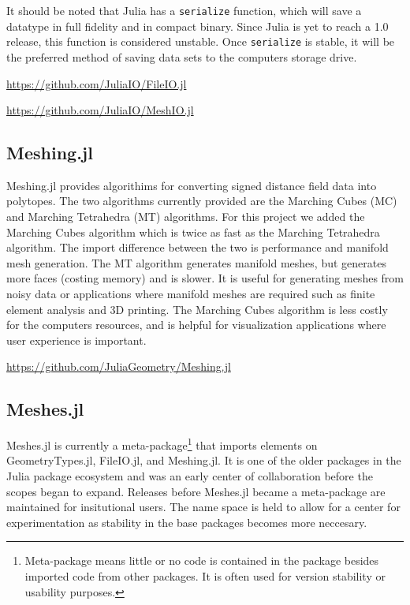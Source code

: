 It should be noted that Julia has a \texttt{serialize} function, which will
save a datatype in full fidelity and in compact binary. Since Julia is
yet to reach a 1.0 release, this function is considered unstable. Once
\texttt{serialize} is stable, it will be the preferred method of saving
data sets to the computers storage drive.

\url{https://github.com/JuliaIO/FileIO.jl}

\url{https://github.com/JuliaIO/MeshIO.jl}

\subsection{Meshing.jl}

Meshing.jl provides algorithims for converting signed distance field
data into polytopes. The two algorithms currently provided are
the Marching Cubes (MC) and Marching Tetrahedra (MT) algorithms. For this project
we added the Marching Cubes algorithm which is twice as fast as the
Marching Tetrahedra algorithm. The import difference between the two is
performance and manifold mesh generation. The MT algorithm generates manifold
meshes, but generates more faces (costing memory) and is slower.
It is useful for generating
meshes from noisy data or applications where manifold meshes are required
such as finite element analysis and 3D printing. The Marching Cubes algorithm
is less costly for the computers resources, and is helpful for visualization
applications where user experience is important.

\url{https://github.com/JuliaGeometry/Meshing.jl}

\subsection{Meshes.jl}

Meshes.jl is currently a meta-package\footnote{Meta-package means
little or no code is contained in the package besides imported code
from other packages. It is
often used for version stability or usability purposes.} that imports elements on GeometryTypes.jl,
FileIO.jl, and Meshing.jl. It is one of the older packages in the
Julia package ecosystem and was an early center of collaboration before
the scopes began to expand. Releases before Meshes.jl became a meta-package 
are maintained for insitutional users. The name space is held to
allow for a center for experimentation as stability in the base packages
becomes more neccesary.

